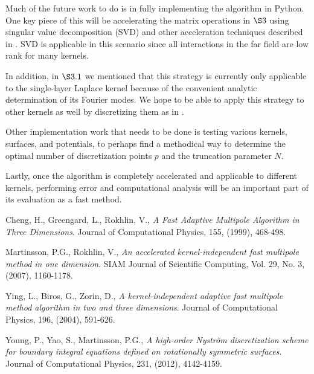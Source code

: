 \documentclass[12pt,letterpaper]{article}
\begin{document}
Much of the future work to do is in fully implementing the algorithm in Python. One key piece of this will be accelerating the matrix operations in $\S3$ using singular value decomposition (SVD) and other acceleration techniques described in \cite{MV}. SVD is applicable in this scenario since all interactions in the far field are low rank for many kernels.

In addition, in $\S3.1$ we mentioned that this strategy is currently only applicable to the single-layer Laplace kernel because of the convenient analytic determination of its Fourier modes. We hope to be able to apply this strategy to other kernels as well by discretizing them as in \cite{YYM}.

Other implementation work that needs to be done is testing various kernels, surfaces, and potentials, to perhaps find a methodical way to determine the optimal number of discretization points $p$ and the truncation parameter $N$.

Lastly, once the algorithm is completely accelerated and applicable to different kernels, performing error and computational analysis will be an important part of its evaluation as a fast method.

\begin{thebibliography}{99}

 Cheng, H., Greengard, L., Rokhlin, V., \emph{A Fast Adaptive Multipole Algorithm in Three Dimensions}. Journal of Computational Physics, 155, (1999), 468-498.


 Martinsson, P.G., Rokhlin, V., \emph{An accelerated kernel-independent fast multipole method in one dimension}. SIAM Journal of Scientific Computing, Vol. 29, No. 3, (2007), 1160-1178.

 Ying, L., Biros, G., Zorin, D., \emph{A kernel-independent adaptive fast multipole method algorithm in two and three dimensions}. Journal of Computational Physics, 196, (2004), 591-626.

 Young, P., Yao, S., Martinsson, P.G., \emph{A high-order Nystr{\"o}m discretization scheme for boundary integral equations defined on rotationally symmetric surfaces}. Journal of Computational Physics, 231, (2012), 4142-4159.

\end{thebibliography}
\end{document}

